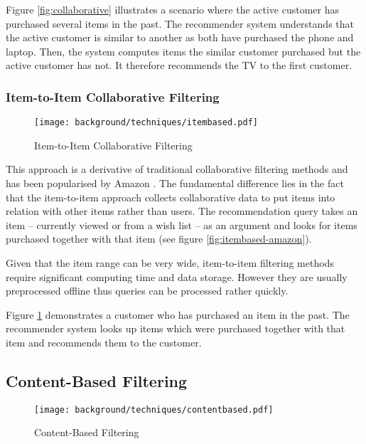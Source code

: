 Figure \ref{fig:collaborative} illustrates a scenario where the active customer has purchased several items in the past. The recommender system understands that the active customer is similar to another as both have purchased the phone and laptop. Then, the system computes items the similar customer purchased but the active customer has not. It therefore recommends the TV to the first customer.

\subsubsection{Item-to-Item Collaborative Filtering}
\label{bg-tech-itembased}

\begin{figure}[ht]
    \texttt{[image: background/techniques/itembased.pdf]}
    \caption{Item-to-Item Collaborative Filtering}
    \label{fig:itembased}
\end{figure}

This approach is a derivative of traditional collaborative filtering methods and has been popularised by Amazon \cite{linden03}. The fundamental difference lies in the fact that the item-to-item approach collects collaborative data to put items into relation with other items rather than users. The recommendation query takes an item -- currently viewed or from a wish list -- as an argument and looks for items purchased together with that item (see figure \ref{fig:itembased-amazon}).

Given that the item range can be very wide, item-to-item filtering methods require significant computing time and data storage. However they are usually preprocessed offline thus queries can be processed rather quickly.

Figure \ref{fig:itembased} demonstrates a customer who has purchased an item in the past. The recommender system looks up items which were purchased together with that item and recommends them to the customer.

\subsection{Content-Based Filtering}

\begin{figure}[ht]
    \texttt{[image: background/techniques/contentbased.pdf]}
    \caption{Content-Based Filtering}
    \label{fig:contentbased}
\end{figure}

